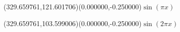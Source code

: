 \documentclass[12pt]{article}
\begin{document}
\kern -384.913041pt%
%
%
%
\fontsize{12.000000}{14.400000}\selectfont%
\usefont{\ASYencoding}{\ASYfamily}{\ASYseries}{\ASYshape}%
\ASYalign(329.659761,121.601706)(0.000000,-0.250000){$\sin(\pi x)$}%
%
%
\fontsize{12.000000}{14.400000}\selectfont%
\ASYalign(329.659761,103.599006)(0.000000,-0.250000){$\sin(2\pi x)$}%
\end{document}
